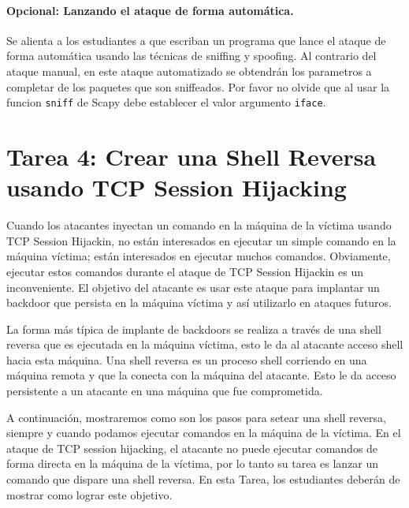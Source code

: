 \paragraph{Opcional: Lanzando el ataque de forma automática.}
Se alienta a los estudiantes a que escriban un programa que lance el ataque de forma automática usando las técnicas de sniffing y spoofing. Al contrario del ataque manual, en este ataque automatizado se obtendrán los parametros a completar de los paquetes que son sniffeados.
Por favor no olvide que al usar la funcion \texttt{sniff} de Scapy debe establecer el valor argumento \texttt{iface}.





\section{Tarea 4: Crear una Shell Reversa usando TCP Session Hijacking}

Cuando los atacantes inyectan un comando en la máquina de la víctima usando
TCP Session Hijackin, no están interesados en ejecutar un simple
comando en la máquina víctima; están interesados en ejecutar muchos
comandos. Obviamente, ejecutar estos comandos durante el ataque de TCP Session Hijackin es un inconveniente. El objetivo del atacante es usar este
ataque para implantar un backdoor que persista en la máquina víctima y así utilizarlo en ataques futuros.

La forma más típica de implante de backdoors se realiza a través de una shell reversa que es ejecutada en la máquina víctima, esto le da al atacante acceso shell hacia esta máquina.
Una shell reversa es un proceso shell corriendo en una máquina remota y que la conecta con la máquina del atacante. Esto le da acceso persistente a un atacante en una máquina que fue comprometida.

A continuación, mostraremos como son los pasos para setear una shell reversa, siempre y cuando podamos ejecutar comandos en la máquina de la víctima.
En el ataque de TCP session hijacking, el atacante no puede ejecutar comandos de forma directa en la máquina de la víctima, por lo tanto su tarea es lanzar un comando que dispare una shell reversa.
En esta Tarea, los estudiantes deberán de mostrar como lograr este objetivo.

